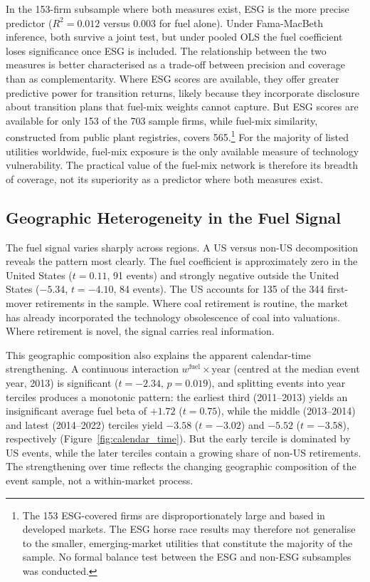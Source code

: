 \documentclass[12pt,a4paper]{article}
\begin{document}
In the 153-firm subsample where both measures exist, ESG is the more precise predictor ($R^2 = 0.012$ versus $0.003$ for fuel alone). Under Fama-MacBeth inference, both survive a joint test, but under pooled OLS the fuel coefficient loses significance once ESG is included. The relationship between the two measures is better characterised as a trade-off between precision and coverage than as complementarity. Where ESG scores are available, they offer greater predictive power for transition returns, likely because they incorporate disclosure about transition plans that fuel-mix weights cannot capture. But ESG scores are available for only 153 of the 703 sample firms, while fuel-mix similarity, constructed from public plant registries, covers 565.\footnote{The 153 ESG-covered firms are disproportionately large and based in developed markets. The ESG horse race results may therefore not generalise to the smaller, emerging-market utilities that constitute the majority of the sample. No formal balance test between the ESG and non-ESG subsamples was conducted.} For the majority of listed utilities worldwide, fuel-mix exposure is the only available measure of technology vulnerability. The practical value of the fuel-mix network is therefore its breadth of coverage, not its superiority as a predictor where both measures exist.


\subsection{Geographic Heterogeneity in the Fuel Signal}\label{sec:learning}

The fuel signal varies sharply across regions. A US versus non-US decomposition reveals the pattern most clearly. The fuel coefficient is approximately zero in the United States ($t = 0.11$, 91 events) and strongly negative outside the United States ($-5.34$, $t = -4.10$, 84 events). The US accounts for 135 of the 344 first-mover retirements in the sample. Where coal retirement is routine, the market has already incorporated the technology obsolescence of coal into valuations. Where retirement is novel, the signal carries real information.

This geographic composition also explains the apparent calendar-time strengthening. A continuous interaction $w^{\text{fuel}} \times \text{year}$ (centred at the median event year, 2013) is significant ($t = -2.34$, $p = 0.019$), and splitting events into year terciles produces a monotonic pattern: the earliest third (2011--2013) yields an insignificant average fuel beta of $+1.72$ ($t = 0.75$), while the middle (2013--2014) and latest (2014--2022) terciles yield $-3.58$ ($t = -3.02$) and $-5.52$ ($t = -3.58$), respectively (Figure~\ref{fig:calendar_time}). But the early tercile is dominated by US events, while the later terciles contain a growing share of non-US retirements. The strengthening over time reflects the changing geographic composition of the event sample, not a within-market process.
\end{document}

